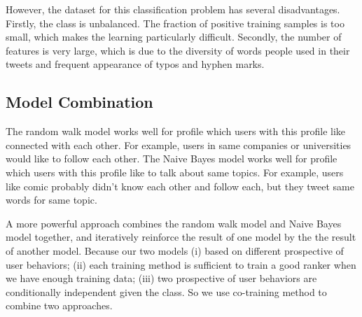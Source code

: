 \documentclass{article}
\begin{document}


However, the dataset for this classification problem has several disadvantages. Firstly, the class is unbalanced. The fraction of positive training samples is too small, which makes the learning particularly difficult. Secondly, the number of features is very large, which is due to the diversity of words people used in their tweets and frequent appearance of typos and hyphen marks. 

\subsection{Model Combination}

The random walk model works well for profile which users with this profile like connected with each other. For example, users in same companies or universities would like to follow each other. The Naive Bayes model works well for profile which users with this profile like to talk about same topics. For example, users like comic probably didn't know each other and follow each, but they tweet same words for same topic.

A more powerful approach combines the random walk model and Naive Bayes model together, and iteratively reinforce the result of one model by the the result of another model. Because our two models (i) based on different prospective of user behaviors; (ii) each training method is sufficient to train a good ranker when we have enough training data; (iii) two prospective of user behaviors are conditionally independent given the class. So we use co-training \cite{cotraining} method to combine two approaches.
\end{document}
